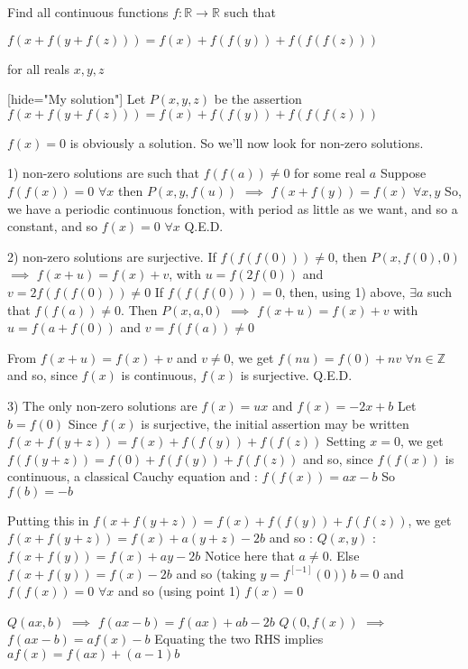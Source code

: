 \begin{solution}
	\begin{tcolorbox}Find all continuous functions $ f: \mathbb{R}\rightarrow\mathbb{R}$ such that

$ f(x + f(y + f(z))) = f(x) + f(f(y)) + f(f(f(z)))$

for all reals $ x,y,z$\end{tcolorbox}

[hide="My solution"]
Let $ P(x,y,z)$ be the assertion $ f(x + f(y + f(z))) = f(x) + f(f(y)) + f(f(f(z)))$

$ f(x) = 0$ is obviously a solution. So we'll now look for non-zero solutions.

1) non-zero solutions are such that $ f(f(a))\neq 0$ for some real $ a$
Suppose $ f(f(x)) = 0$ $ \forall x$ then $ P(x,y,f(u))$ $ \implies$ $ f(x + f(y)) = f(x)$ $ \forall x,y$
So, we have a periodic continuous fonction, with period as little as we want, and so a constant, and so $ f(x) = 0$ $ \forall x$
Q.E.D.

2) non-zero solutions are surjective.
If $ f(f(f(0)))\neq 0$, then $ P(x,f(0),0)$ $ \implies$ $ f(x + u) = f(x) + v$, with $ u = f(2f(0))$ and $ v = 2f(f(f(0)))\neq 0$
If $ f(f(f(0))) = 0$, then, using 1) above, $ \exists a$ such that $ f(f(a))\neq 0$. Then $ P(x,a,0)$ $ \implies$ $ f(x + u) = f(x) + v$ with $ u = f(a + f(0))$ and $ v = f(f(a))\neq 0$

From $ f(x + u) = f(x) + v$ and $ v\neq 0$, we get $ f(nu) = f(0) + nv$ $ \forall n\in \mathbb Z$ and so, since $ f(x)$ is continuous, $ f(x)$ is surjective.
Q.E.D.

3) The only non-zero solutions are $ f(x) = ux$ and $ f(x) = - 2x + b$
Let $ b = f(0)$
Since $ f(x)$ is surjective, the initial assertion may be written $ f(x + f(y + z)) = f(x) + f(f(y)) + f(f(z))$
Setting $ x = 0$, we get $ f(f(y + z)) = f(0) + f(f(y)) + f(f(z))$ and so, since $ f(f(x))$ is continuous, a classical Cauchy equation and : $ f(f(x)) = ax - b$
So $ f(b) = - b$

Putting this in $ f(x + f(y + z)) = f(x) + f(f(y)) + f(f(z))$, we get $ f(x + f(y + z)) = f(x) + a(y + z) - 2b$ and so :
$ Q(x,y)$ : $ f(x + f(y)) = f(x) + ay - 2b$
Notice here that $ a\neq 0$. Else $ f(x + f(y)) = f(x) - 2b$ and so (taking $ y = f^{[ - 1]}(0)$) $ b = 0$ and $ f(f(x)) = 0$ $ \forall x$ and so (using point 1) $ f(x) = 0$

$ Q(ax,b)$ $ \implies$ $ f(ax - b) = f(ax) + ab - 2b$
$ Q(0,f(x))$ $ \implies$ $ f(ax - b) = af(x) - b$
Equating the two RHS implies $ af(x) = f(ax) + (a - 1)b$


\end{solution}
